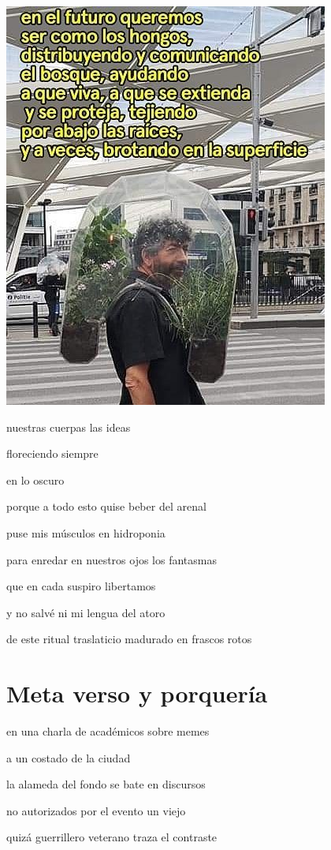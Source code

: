 \documentclass[
]{book}
\begin{document}
\includegraphics{images/1.png}

nuestras cuerpas las ideas

floreciendo siempre

en lo oscuro

porque a todo esto quise beber del arenal

puse mis músculos en hidroponia

para enredar en nuestros ojos los fantasmas

que en cada suspiro libertamos

y no salvé ni mi lengua del atoro

de este ritual traslaticio madurado en frascos rotos

\hypertarget{meta-verso-y-porqueruxeda}{%
\chapter{Meta verso y porquería}\label{meta-verso-y-porqueruxeda}}

en una charla de académicos sobre memes

a un costado de la ciudad

la alameda del fondo se bate en discursos

no autorizados por el evento un viejo

quizá guerrillero veterano traza el contraste
\end{document}
